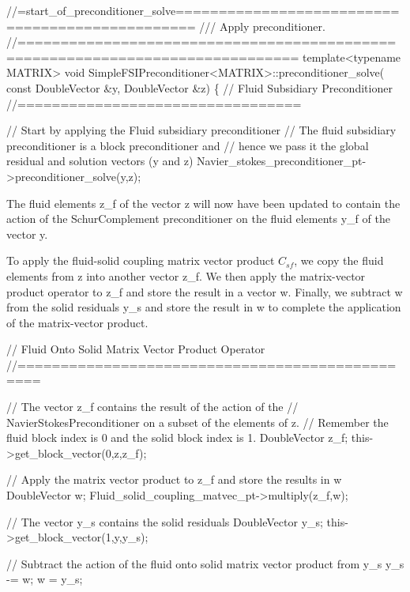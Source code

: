  
\begin{DoxyCodeInclude}
\textcolor{comment}{//=start\_of\_preconditioner\_solve================================================}
\textcolor{comment}{/// Apply preconditioner.}
\textcolor{comment}{}\textcolor{comment}{//==============================================================================}
 \textcolor{keyword}{template}<\textcolor{keyword}{typename} MATRIX> 
 \textcolor{keywordtype}{void} SimpleFSIPreconditioner<MATRIX>::preconditioner\_solve(
  \textcolor{keyword}{const} DoubleVector &y, DoubleVector &z)
\{
 \textcolor{comment}{// Fluid Subsidiary Preconditioner}
 \textcolor{comment}{//=================================}

 \textcolor{comment}{// Start by applying the Fluid subsidiary preconditioner}
 \textcolor{comment}{// The fluid subsidiary preconditioner is a block preconditioner and}
 \textcolor{comment}{// hence we pass it the global residual and solution vectors (y and z)}
 Navier\_stokes\_preconditioner\_pt->preconditioner\_solve(y,z);

\end{DoxyCodeInclude}


The fluid elements {\ttfamily z\+\_\+f} of the vector {\ttfamily z} will now have been updated to contain the action of the Schur\+Complement preconditioner on the fluid elements {\ttfamily y\+\_\+f} of the vector {\ttfamily y}.

To apply the fluid-\/solid coupling matrix vector product $C_{sf}$, we copy the fluid elements from {\ttfamily z} into another vector {\ttfamily z\+\_\+f}. We then apply the matrix-\/vector product operator to {\ttfamily z\+\_\+f} and store the result in a vector {\ttfamily w}. Finally, we subtract {\ttfamily w} from the solid residuals {\ttfamily y\+\_\+s} and store the result in {\ttfamily w} to complete the application of the matrix-\/vector product.

 
\begin{DoxyCodeInclude}
 \textcolor{comment}{// Fluid Onto Solid Matrix Vector Product Operator}
 \textcolor{comment}{//================================================}

 \textcolor{comment}{// The vector z\_f contains the result of the action of the }
 \textcolor{comment}{// NavierStokesPreconditioner on a subset of  the elements of z.}
 \textcolor{comment}{// Remember the fluid block index is 0 and the solid block index is 1.}
 DoubleVector z\_f;
 this->get\_block\_vector(0,z,z\_f);

 \textcolor{comment}{// Apply the matrix vector product to z\_f and store the results in w}
 DoubleVector w;
 Fluid\_solid\_coupling\_matvec\_pt->multiply(z\_f,w);

 \textcolor{comment}{// The vector y\_s contains the solid residuals}
 DoubleVector y\_s;
 this->get\_block\_vector(1,y,y\_s);

 \textcolor{comment}{// Subtract the action of the fluid onto solid matrix vector product from y\_s}
 y\_s -= w;
 w = y\_s; 

\end{DoxyCodeInclude}


